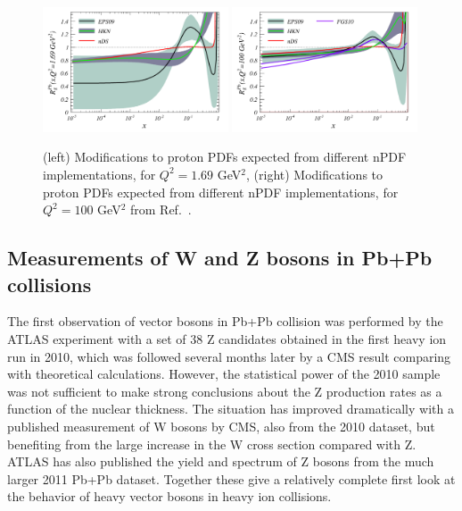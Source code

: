 \begin{figure}[t]
\begin{center}
\includegraphics[width=0.49\textwidth]{electroweak_figs/gluonsnew.pdf}
\includegraphics[width=0.49\textwidth]{electroweak_figs/gluonsnew100.pdf}
\caption[]{
(left) Modifications to proton PDFs expected from different nPDF implementations, for $Q^2=1.69$ GeV$^2$,
(right) Modifications to proton PDFs expected from different nPDF implementations, for $Q^2=100$ GeV$^2$
from Ref.~\cite{Salgado:2011wc}.
}
\label{fig:pas:salgado}
\end{center}
\end{figure}

\subsection{Measurements of W and Z bosons in Pb+Pb collisions}

The first observation of vector bosons in Pb+Pb collision was performed by the ATLAS
experiment with a set of 38 Z candidates obtained in the first heavy ion run in 2010, which
was followed several months later by a CMS result comparing with theoretical calculations.
However, the statistical power of the 2010 sample was not sufficient to make strong conclusions
about the Z production rates as a function of the nuclear thickness.
The situation has improved dramatically with a published measurement of W bosons by CMS, also from the
2010 dataset, but benefiting from the large increase in the W cross section compared with Z.
ATLAS has also published the yield and spectrum of Z bosons from the much larger 2011 Pb+Pb dataset.
Together these give a relatively complete first look at the behavior of heavy vector bosons in 
heavy ion collisions.


